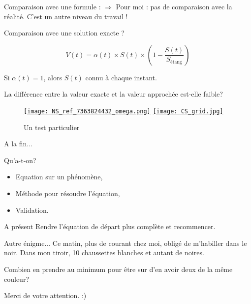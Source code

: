 \documentclass[11pt]{beamer}
\begin{document}
\begin{frame}{Comparaison avec une formule :}
$\Rightarrow$ Pour moi : pas de comparaison avec la réalité. C'est un autre niveau du travail !

Comparaison avec une solution exacte ?

$$V(t) = \alpha(t) \times S(t) \times \left( 1 - \dfrac{S(t)}{S_{\text{étang}}} \right)$$

Si $\alpha(t) = 1$, alors $S(t)$ connu à chaque instant.

\begin{exampleblock}{}
La différence entre la valeur exacte et la valeur approchée est-elle faible?
\end{exampleblock}

\end{frame}

\begin{frame}
\begin{figure}
\href{run:ref_7363864802_NSE.avi}{\texttt{[image: NS\_ref\_7363824432\_omega.png]}} 
\href{run:ref_7363145849_test_2.avi}{\texttt{[image: CS\_grid.jpg]}} 
\caption{Un test particulier}
\end{figure}
\end{frame}

\begin{frame}{A la fin...}
\begin{block}{Qu'a-t-on?}
\begin{itemize}
\item Equation sur un phénomène,
\item Méthode pour résoudre l'équation,
\item Validation.
\end{itemize}
\end{block}

\begin{block}{A présent}
Rendre l'équation de départ plus complète et recommencer.
\end{block}

\end{frame}



\begin{frame}

\begin{block}{Autre énigme...}
Ce matin, plus de courant chez moi, obligé de m'habiller dans le noir.
Dans mon tiroir, 10 chaussettes blanches et autant de noires. 

Combien en prendre au minimum pour être sur d'en avoir deux de la même couleur?
\end{block}

\end{frame}


\begin{frame}
\begin{center}
Merci de votre attention. :)
\end{center}
\end{frame}
\end{document}
